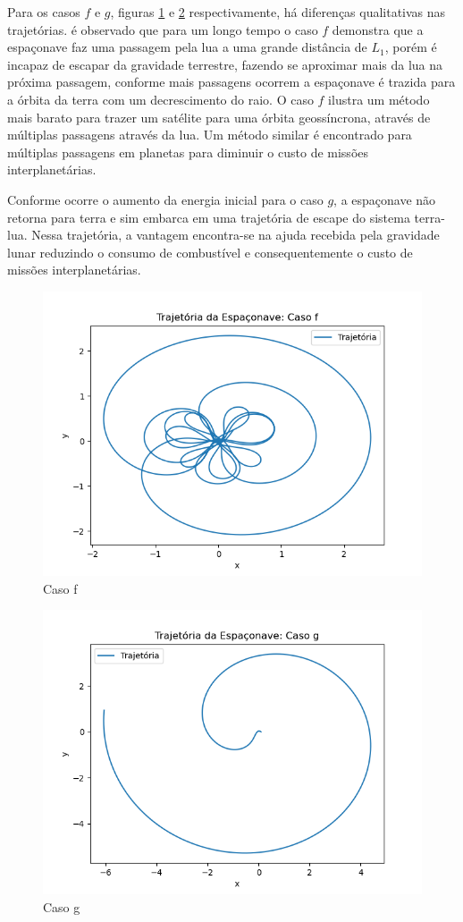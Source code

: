 Para os casos $f$ e $g$, figuras \ref{fig: f} e \ref{fig: g} respectivamente, há diferenças qualitativas nas trajetórias. é observado que para um longo tempo o caso $f$ demonstra que a espaçonave faz uma passagem pela lua a uma grande distância de $L_1$, porém é incapaz de escapar da gravidade terrestre, fazendo se aproximar mais da lua na próxima passagem, conforme mais passagens ocorrem a espaçonave é trazida para a órbita da terra com um decrescimento do raio. O caso $f$ ilustra um método mais barato para trazer um satélite para uma órbita geossíncrona, através de múltiplas passagens através da lua. Um método similar é encontrado para múltiplas passagens em planetas para diminuir o custo de missões interplanetárias.

Conforme ocorre o aumento da energia inicial para o caso $g$, a espaçonave não retorna para terra e sim embarca em uma trajetória de escape do sistema terra-lua. Nessa trajetória, a vantagem encontra-se na ajuda recebida pela gravidade lunar reduzindo o consumo de combustível e consequentemente o custo de missões interplanetárias.

\begin{figure}[H]
\centering
\caption{Caso f}
\label{fig: f}
\includegraphics[width=1\textwidth]{figuras/Resultados/7.3/73casof.png}
\end{figure}

\begin{figure}[H]
\centering
\caption{Caso g}
\label{fig: g}
\includegraphics[width=1\textwidth]{figuras/Resultados/7.3/73casog.png}
\end{figure}